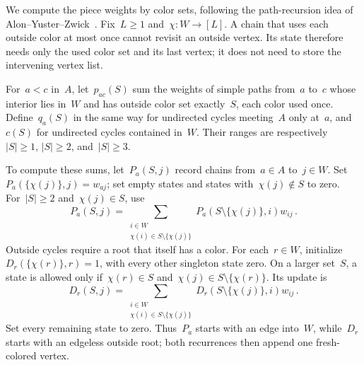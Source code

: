\documentclass[10pt]{article}
\theoremstyle{plain}
\theoremstyle{definition}
\theoremstyle{remark}
\begin{document}
We compute the piece weights by color sets, following the path-recursion idea of Alon--Yuster--Zwick~\cite{AYZ95}. Fix~$L\ge1$ and~$\chi:W\to[L]$. A chain that uses each outside color at most once cannot revisit an outside vertex. Its state therefore needs only the used color set and its last vertex; it does not need to store the intervening vertex list.

For~$a<c$ in~$A$, let~$p_{ac}(S)$ sum the weights of simple paths from~$a$ to~$c$ whose interior lies in~$W$ and has outside color set exactly~$S$, each color used once. Define~$q_a(S)$ in the same way for undirected cycles meeting~$A$ only at~$a$, and~$c(S)$ for undirected cycles contained in~$W$. Their ranges are respectively~$|S|\ge1$, $|S|\ge2$, and~$|S|\ge3$.

To compute these sums, let~$P_a(S,j)$ record chains from~$a\in A$ to~$j\in W$. Set~$P_a(\{\chi(j)\},j)=w_{aj}$; set empty states and states with~$\chi(j)\notin S$ to zero. For~$|S|\ge2$ and~$\chi(j)\in S$, use
\begin{equation}\label{eq:sk-path-dp}
 P_a(S,j)=\sum_{\substack{i\in W\\\chi(i)\in S\setminus\{\chi(j)\}}}
 P_a(S\setminus\{\chi(j)\},i)w_{ij}\,.
\end{equation}
Outside cycles require a root that itself has a color. For each~$r\in W$, initialize~$D_r(\{\chi(r)\},r)=1$, with every other singleton state zero. On a larger set~$S$, a state is allowed only if~$\chi(r)\in S$ and~$\chi(j)\in S\setminus\{\chi(r)\}$. Its update is
\begin{equation}\label{eq:sk-cycle-dp}
 D_r(S,j)=\sum_{\substack{i\in W\\\chi(i)\in S\setminus\{\chi(j)\}}}
 D_r(S\setminus\{\chi(j)\},i)w_{ij}\,.
\end{equation}
Set every remaining state to zero. Thus~$P_a$ starts with an edge into~$W$, while~$D_r$ starts with an edgeless outside root; both recurrences then append one fresh-colored vertex.
\end{document}
